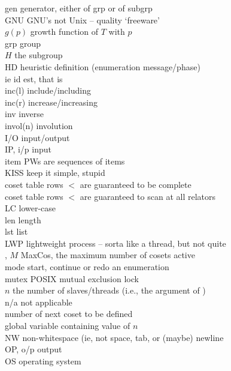 \begin{tabbing}
gen	   	\> generator, either of grp or of subgrp \\
GNU	   	\> GNU's not Unix -- quality `freeware' \\
$g(p)$     	\> growth function of $T$ with $p$ \\
grp	   	\> group \\
$H$	   	\> the subgroup \\
HD         	\> heuristic definition (enumeration message/phase) \\
ie	   	\> id est, that is \\
inc(l)     	\> include/including \\
inc(r)     	\> increase/increasing \\
inv        	\> inverse \\
invol(n)   	\> involution \\
I/O        	\> input/output \\
IP, i/p	   	\> input \\
item       	\> PWs are sequences of items \\
KISS	   	\> keep it simple, stupid \\
 	\> coset table rows $<$ are guaranteed to be complete \\
 	\> coset table rows $<$ are guaranteed to scan at all relators \\
LC	   	\> lower-case \\
len        	\> length \\
lst	   	\> list \\
LWP	   	\> lightweight process -- sorta like a thread, but not quite \\
, $M$ 	\> MaxCos, the maximum number of cosets active \\
mode	   	\> start, continue or redo an enumeration \\
mutex	   	\> POSIX mutual exclusion lock \\
$n$        	\> the number of slaves/threads (i.e., the argument of ) \\
n/a	   	\> not applicable \\
 	\> number of next coset to be defined \\
	\> global variable containing value of $n$ \\
NW         	\> non-whitespace (ie, not space, tab, or (maybe) newline \\ 
OP, o/p	   	\> output \\
OS         	\> operating system \\

\end{tabbing}

